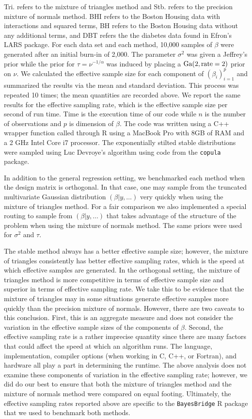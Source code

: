 \documentclass{article}
\begin{document}
Tri. refers to the mixture of triangles method and Stb. refers to the precision
mixture of normals method.  BHI refers to the Boston Housing data with
interactions and squared terms, BH refers to the Boston Housing data without any
additional terms, and DBT refers the the diabetes data found in Efron's LARS
package. For each data set and each method, 10,000 samples of $\beta$ were
generated after an initial burn-in of 2,000.  The parameter $\sigma^2$ was given
a Jeffrey's prior while the prior for $\tau = \nu^{-1/\alpha}$ was induced by
placing a $\textmd{Ga}(2, \textmd{rate}=2)$ prior on $\nu$.  We calculated the
effective sample size for each component of $(\beta_i)_{i=1}^p$ and summarized
the results via the mean and standard deviation.  This process was repeated 10
times; the mean quantities are recorded above.  We report the same results for
the effective sampling rate, which is the effective sample size per second of
run time.  Time is the execution time of our code while $n$ is the number of
observations and $p$ is dimension of $\beta$.  The code was written using a C++
wrapper function called through R using a MacBook Pro with 8GB of RAM and a 2
GHz Intel Core i7 processor.  The exponentially stilted stable distributions
were sampled using Luc Devroye's algorithm using code from the \texttt{copula}
package.

In addition to the general regression setting, we benchmarked each method when
the design matrix is orthogonal.  In that case, one may sample from the
truncated multivariate Gaussian distribution $(\beta | y, \ldots)$ very quickly
when using the mixture of triangles method.  For a fair comparison we also
implemented a special routing to sample from $(\beta | y, \ldots)$ that takes
advantage of the structure of the problem when using the mixture of normals
method.  The same priors were used for $\sigma^2$ and $\tau$.

The stable method always has a better effective sample size; however, the
mixture of triangles consistently has better effective sampling rates, which is
the speed at which effective samples are generated.  In the orthogonal setting,
the mixture of triangles method is more competitive in terms of effective sample
size and superior in terms of effective sampling rate. We take this to be
evidence that the mixture of triangles may in some situations generate effective
samples more quickly than the precision mixture of normals.  However, there are
two caveats to this conclusion.  First, this is an aggregate measure and does
not consider the variation in the effective sample sizes of the components of
$\beta$.  Second, the effective sampling rate is a rather imprecise quantity
since there are many factors that could affect the speed at which an algorithm
runs.  The language, implementation, compiler options (when working in C, C++,
or Fortran), and hardware all play a part in determining the runtime.  The above
analysis does not examine these components of variation in the effective
sampling rate; however, we did do our best to ensure that both the mixture of
triangles method and the mixture of normals method were compared on equal
footing.  Ultimately, the effective sampling rates reported above are specific
to the \texttt{BayesBridge} R package that we used to benchmark both methods.

% 
\end{document}
